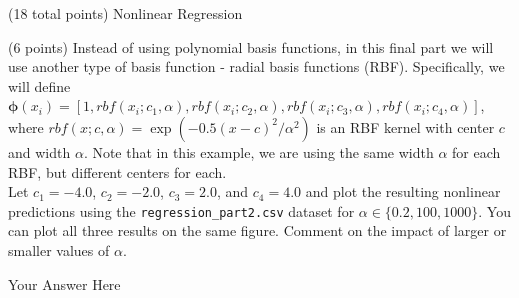 \documentclass[12pt]{article}
\begin{document}
\begin{question}{(18 total points) Nonlinear Regression}
\begin{subquestion}
\end{subquestion}



%
%
\begin{subquestion}{(6 points) Instead of using polynomial basis functions, in this final part we will use another type of basis function - radial basis functions (RBF). 
Specifically, we will define $\boldsymbol{\phi}(x_i) = [1, rbf(x_i; c_1, \alpha), rbf(x_i; c_2, \alpha), rbf(x_i; c_3, \alpha), rbf(x_i; c_4, \alpha)]$, where $rbf(x; c, \alpha) =  \exp(-0.5(x-c)^2 / \alpha^2)$ is an RBF kernel with center $c$ and width $\alpha$. Note that in this example, we are using the same width $\alpha$ for each RBF, but different centers for each.\\ 
Let $c_1=-4.0$, $c_2=-2.0$, $c_3=2.0$, and $c_4=4.0$ and plot the resulting nonlinear predictions using the \texttt{regression\_part2.csv} dataset for $\alpha \in \{0.2, 100, 1000\}$. 
You can plot all three results on the same figure.
Comment on the impact of larger or smaller values of $\alpha$.
}


\begin{answerbox}{35em}
Your Answer Here
\end{answerbox}



\end{subquestion}



\end{question}






\clearpage
\end{document}
